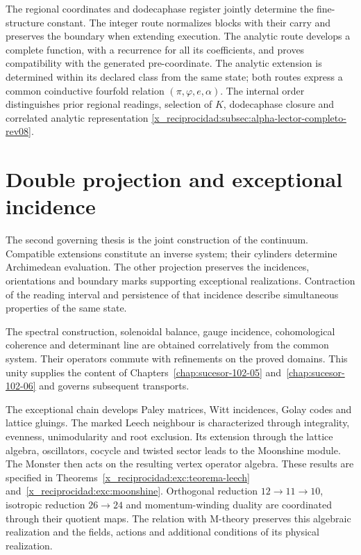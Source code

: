 The regional coordinates and dodecaphase register jointly determine the fine-structure constant. The integer route normalizes blocks with their carry and preserves the boundary when extending execution. The analytic route develops a complete function, with a recurrence for all its coefficients, and proves compatibility with the generated pre-coordinate. The analytic extension is determined within its declared class from the same state; both routes express a common coinductive fourfold relation \((\pi,\varphi,e,\alpha)\). The internal order distinguishes prior regional readings, selection of \(K\), dodecaphase closure and correlated analytic representation \ref{x_reciprocidad:subsec:alpha-lector-completo-rev08}.

\section*{Double projection and exceptional incidence}

The second governing thesis is the joint construction of the continuum. Compatible extensions constitute an inverse system; their cylinders determine Archimedean evaluation. The other projection preserves the incidences, orientations and boundary marks supporting exceptional realizations. Contraction of the reading interval and persistence of that incidence describe simultaneous properties of the same state.

The spectral construction, solenoidal balance, gauge incidence, cohomological coherence and determinant line are obtained correlatively from the common system. Their operators commute with refinements on the proved domains. This unity supplies the content of Chapters~\ref{chap:sucesor-102-05} and~\ref{chap:sucesor-102-06} and governs subsequent transports.

The exceptional chain develops Paley matrices, Witt incidences, Golay codes and lattice gluings. The marked Leech neighbour is characterized through integrality, evenness, unimodularity and root exclusion. Its extension through the lattice algebra, oscillators, cocycle and twisted sector leads to the Moonshine module. The Monster then acts on the resulting vertex operator algebra. These results are specified in Theorems~\ref{x_reciprocidad:exc:teorema-leech} and~\ref{x_reciprocidad:exc:moonshine}. Orthogonal reduction \(12\to11\to10\), isotropic reduction \(26\to24\) and momentum-winding duality are coordinated through their quotient maps. The relation with M-theory preserves this algebraic realization and the fields, actions and additional conditions of its physical realization.

